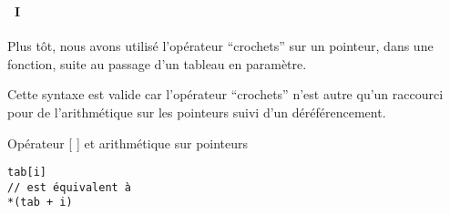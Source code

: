 \begin{frame}[containsverbatim]
  \frametitle{\secname}
  \framesubtitle{\subsecname~I}

  Plus tôt, nous avons utilisé l'opérateur ``crochets'' sur un pointeur, dans une fonction, suite au passage d'un tableau en paramètre.
  \vspace{0.3cm}
  \par
  Cette syntaxe est valide car l'opérateur ``crochets'' n'est autre qu'un raccourci pour de l'arithmétique sur les pointeurs suivi d'un
  déréférencement.
  \begin{exampleblock}{Opérateur [ ] et arithmétique sur pointeurs}
    \begin{verbatim}
tab[i]
// est équivalent à 
*(tab + i)\end{verbatim}
  \end{exampleblock}
\end{frame}


